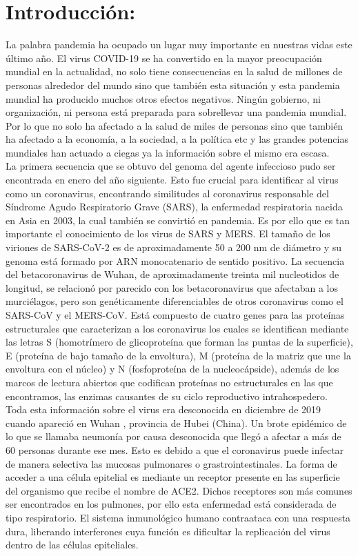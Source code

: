 \documentclass{article}
\begin{document}
	
	\section{Introducción:}
		La palabra pandemia ha ocupado un lugar muy importante en nuestras vidas este último año. El virus COVID-19 se ha convertido en la mayor preocupación mundial en la actualidad, no solo tiene consecuencias en la salud de millones de personas alrededor del mundo sino que también esta situación y esta pandemia mundial ha producido muchos otros efectos negativos. Ningún gobierno, ni organización, ni persona está preparada para sobrellevar una pandemia mundial. Por lo que no solo ha afectado a la salud de miles de personas sino que también ha afectado a la economía, a la sociedad, a la política etc y las grandes potencias mundiales han actuado a ciegas ya la información sobre el mismo era escasa.\\
		
		La primera secuencia que se obtuvo del genoma del agente infeccioso pudo ser encontrada en enero del año siguiente. Esto fue crucial para identificar al virus como un coronavirus, encontrando similitudes al coronavirus responsable del Síndrome Agudo Respiratorio Grave (SARS), la enfermedad respiratoria nacida en Asia en 2003, la cual también se convirtió en pandemia. Es por ello que es tan importante el conocimiento de los virus de SARS y MERS. El tamaño de los viriones de SARS-CoV-2 es de aproximadamente 50 a 200 nm de diámetro y su genoma está formado por ARN monocatenario de sentido positivo. La secuencia del betacoronavirus de Wuhan, de aproximadamente treinta mil nucleotidos de longitud, se relacionó por parecido con los betacoronavirus que afectaban a los murciélagos, pero son genéticamente diferenciables de otros coronavirus como el SARS-CoV y el MERS-CoV.  Está compuesto de cuatro genes para las proteínas estructurales que caracterizan a los coronavirus los cuales se identifican mediante las letras S (homotrímero de glicoproteína que forman las puntas de la superficie), E (proteína de bajo tamaño de la envoltura), M (proteína de la matriz que une la envoltura con el núcleo) y N (fosfoproteína de la nucleocápside), además de los marcos de lectura abiertos que codifican proteínas no estructurales en las que encontramos, las enzimas causantes de su ciclo reproductivo intrahospedero. \\
		
		Toda esta información sobre el virus era desconocida en diciembre de 2019 cuando apareció en Wuhan , provincia de Hubei (China). Un brote epidémico de lo que se llamaba neumonía por causa desconocida que llegó a afectar a más de 60 personas durante ese mes. Esto es debido a que el coronavirus puede infectar de manera selectiva las mucosas pulmonares o grastrointestinales. La forma de acceder a una célula epitelial es mediante un receptor presente en las superficie del organismo que recibe el nombre de ACE2. Dichos receptores son más comunes ser encontrados en los pulmones, por ello esta enfermedad está considerada de tipo respiratorio. El sistema inmunológico humano contraataca con una respuesta dura, liberando interferones cuya función es dificultar la replicación del virus dentro de las células epiteliales.\\
		
\end{document}
